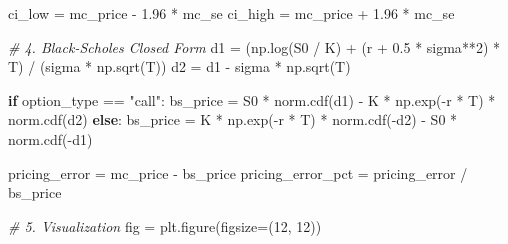 \documentclass[
  11pt,
]{article}
\newenvironment{Shaded}{}{}
\newcommand{\CommentTok}[1]{\textcolor[rgb]{0.38,0.63,0.69}{\textit{#1}}}
\newcommand{\ControlFlowTok}[1]{\textcolor[rgb]{0.00,0.44,0.13}{\textbf{#1}}}
\newcommand{\DecValTok}[1]{\textcolor[rgb]{0.25,0.63,0.44}{#1}}
\newcommand{\FloatTok}[1]{\textcolor[rgb]{0.25,0.63,0.44}{#1}}
\newcommand{\NormalTok}[1]{#1}
\newcommand{\OperatorTok}[1]{\textcolor[rgb]{0.40,0.40,0.40}{#1}}
\newcommand{\StringTok}[1]{\textcolor[rgb]{0.25,0.44,0.63}{#1}}
\begin{document}
\begin{Shaded}
\begin{Highlighting}[]
\NormalTok{ci\_low }\OperatorTok{=}\NormalTok{ mc\_price }\OperatorTok{{-}} \FloatTok{1.96} \OperatorTok{*}\NormalTok{ mc\_se}
\NormalTok{ci\_high }\OperatorTok{=}\NormalTok{ mc\_price }\OperatorTok{+} \FloatTok{1.96} \OperatorTok{*}\NormalTok{ mc\_se}

\CommentTok{\# 4. Black{-}Scholes Closed Form}
\NormalTok{d1 }\OperatorTok{=}\NormalTok{ (np.log(S0 }\OperatorTok{/}\NormalTok{ K) }\OperatorTok{+}\NormalTok{ (r }\OperatorTok{+} \FloatTok{0.5} \OperatorTok{*}\NormalTok{ sigma}\OperatorTok{**}\DecValTok{2}\NormalTok{) }\OperatorTok{*}\NormalTok{ T) }\OperatorTok{/}\NormalTok{ (sigma }\OperatorTok{*}\NormalTok{ np.sqrt(T))}
\NormalTok{d2 }\OperatorTok{=}\NormalTok{ d1 }\OperatorTok{{-}}\NormalTok{ sigma }\OperatorTok{*}\NormalTok{ np.sqrt(T)}

\ControlFlowTok{if}\NormalTok{ option\_type }\OperatorTok{==} \StringTok{"call"}\NormalTok{:}
\NormalTok{    bs\_price }\OperatorTok{=}\NormalTok{ S0 }\OperatorTok{*}\NormalTok{ norm.cdf(d1) }\OperatorTok{{-}}\NormalTok{ K }\OperatorTok{*}\NormalTok{ np.exp(}\OperatorTok{{-}}\NormalTok{r }\OperatorTok{*}\NormalTok{ T) }\OperatorTok{*}\NormalTok{ norm.cdf(d2)}
\ControlFlowTok{else}\NormalTok{:}
\NormalTok{    bs\_price }\OperatorTok{=}\NormalTok{ K }\OperatorTok{*}\NormalTok{ np.exp(}\OperatorTok{{-}}\NormalTok{r }\OperatorTok{*}\NormalTok{ T) }\OperatorTok{*}\NormalTok{ norm.cdf(}\OperatorTok{{-}}\NormalTok{d2) }\OperatorTok{{-}}\NormalTok{ S0 }\OperatorTok{*}\NormalTok{ norm.cdf(}\OperatorTok{{-}}\NormalTok{d1)}

\NormalTok{pricing\_error }\OperatorTok{=}\NormalTok{ mc\_price }\OperatorTok{{-}}\NormalTok{ bs\_price}
\NormalTok{pricing\_error\_pct }\OperatorTok{=}\NormalTok{ pricing\_error }\OperatorTok{/}\NormalTok{ bs\_price}

\CommentTok{\# 5. Visualization}
\NormalTok{fig }\OperatorTok{=}\NormalTok{ plt.figure(figsize}\OperatorTok{=}\NormalTok{(}\DecValTok{12}\NormalTok{, }\DecValTok{12}\NormalTok{))}


\end{Highlighting}
\end{Shaded}
\end{document}
